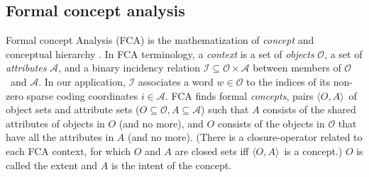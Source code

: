 \documentclass[11pt,a4paper]{article}
\begin{document}
\subsection{Formal concept analysis}

\newcommand{\ob}{\ensuremath{\mathcal O}}
\newcommand{\at}{\ensuremath{\mathcal A}}
\newcommand{\inci}{\ensuremath{\mathcal I}}
\newcommand{\oaconc}{\ensuremath{\langle O, A\rangle}}

Formal concept Analysis (FCA) is the mathematization of \emph{concept} and conceptual
hierarchy \citep{Ganter:2012,Endres:2010}. %
In FCA terminology, a \emph{context} is
a set of \emph{objects} $\ob$, a set of \emph{attributes} $\at$, and
a binary incidency relation $\inci \subseteq \ob \times \at$
between members of \ob~and \at.
In our application, $\inci$ associates a word $w\in\ob$ to 
the indices of its non-zero sparse coding coordinates $i\in\at$.
FCA finds formal \emph{concepts}, pairs \oaconc~of object sets and attribute 
sets ($O\subseteq \ob,A \subseteq \at$) such that $A$
consists of the shared attributes of objects in $O$ (and no more), and
$O$ consists of
the objects in $\ob$ that have all the attributes in $A$ (and no more).
(There is a closure-operator related to each FCA context, for which $O$ and $A$
are closed sets iff \oaconc~is a concept.)
$O$ is called the extent and $A$ is the intent of the concept.
\end{document}

